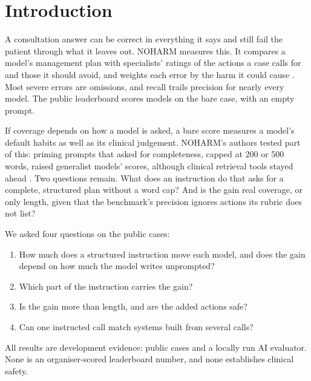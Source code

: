 \documentclass[11pt]{article}
\begin{document}
\section{Introduction}
\label{sec:intro}
A consultation answer can be correct in everything it says and still fail the patient through what
it leaves out. NOHARM measures this. It compares a model's management plan with specialists' ratings
of the actions a case calls for and those it should avoid, and weights each error by the harm it
could cause \citep{wu2025noharm}. Most severe errors are omissions, and recall trails precision for
nearly every model. The public leaderboard scores models on the bare case, with an empty prompt.

If coverage depends on how a model is asked, a bare score measures a model's default habits as well
as its clinical judgement. NOHARM's authors tested part of this: priming prompts that asked for
completeness, capped at 200 or 500 words, raised generalist models' scores, although clinical
retrieval tools stayed ahead \citep{wu2025noharm}. Two questions remain. What does an instruction do
that asks for a complete, structured plan without a word cap? And is the gain real coverage, or only
length, given that the benchmark's precision ignores actions its rubric does not list?

We asked four questions on the public cases:
\begin{enumerate}
\item How much does a structured instruction move each model, and does the gain depend on how much
the model writes unprompted?
\item Which part of the instruction carries the gain?
\item Is the gain more than length, and are the added actions safe?
\item Can one instructed call match systems built from several calls?
\end{enumerate}
All results are development evidence: public cases and a locally run AI evaluator. None is an
organiser-scored leaderboard number, and none establishes clinical safety.
\end{document}

